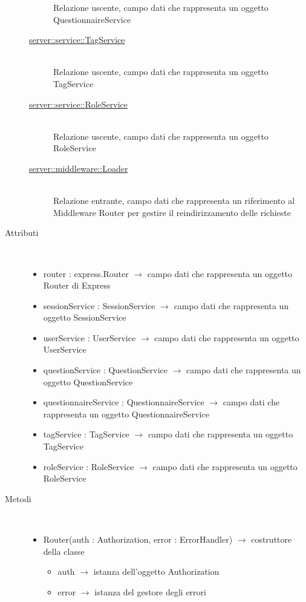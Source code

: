 \begin{description}
\begin{description}
	Relazione uscente, campo dati che rappresenta un oggetto QuestionnaireService
	\item[\hyperlink{server::service::TagService}{server::service::TagService}] \hfill \\
	Relazione uscente, campo dati che rappresenta un oggetto TagService
	\item[\hyperlink{server::service::RoleService}{server::service::RoleService}] \hfill \\
	Relazione uscente, campo dati che rappresenta un oggetto RoleService
	\item[\hyperlink{server::middleware::Loader}{server::middleware::Loader}] \hfill \\
	Relazione entrante, campo dati che rappresenta un riferimento al Middleware Router per gestire il reindirizzamento delle richieste
\end{description}

\item[Attributi] \hfill \\
\vspace{-7mm}
\begin{itemize}
	\item router : express.Router $\rightarrow$ campo dati che rappresenta un oggetto Router di Express
	\item sessionService : SessionService $\rightarrow$ campo dati che rappresenta un oggetto SessionService
	\item userService : UserService $\rightarrow$ campo dati che rappresenta un oggetto UserService
	\item questionService : QuestionService $\rightarrow$ campo dati che rappresenta un oggetto QuestionService
	\item questionnaireService : QuestionnaireService $\rightarrow$ campo dati che rappresenta un oggetto QuestionnaireService
	\item tagService : TagService $\rightarrow$ campo dati che rappresenta un oggetto TagService
	\item roleService : RoleService $\rightarrow$ campo dati che rappresenta un oggetto RoleService
\end{itemize}

\item[Metodi] \hfill \\
\vspace{-7mm}
\begin{itemize}
	\item Router(auth : Authorization, error : ErrorHandler) $\rightarrow$ costruttore della classe\begin{itemize}
		\item auth $\rightarrow$ istanza dell'oggetto Authorization
		\item error $\rightarrow$ istanza del gestore degli errori
	\end{itemize}
	
\end{itemize}

\end{description}

